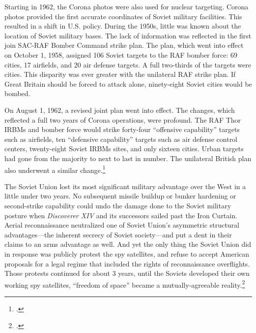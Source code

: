 \documentclass[14pt]{extarticle}
\begin{document}
\begin{quoteblock}
Starting in 1962, the Corona photos were also used for nuclear targeting. Corona photos provided the first accurate coordinates of Soviet military facilities. This resulted in a shift in U.S. policy. During the 1950s, little was known about the location of Soviet military bases. The lack of information was reflected in the first join SAC-RAF Bomber Command strike plan. The plan, which went into effect on October 1, 1958, assigned 106 Soviet targets to the RAF bomber force: 69 cities, 17 airfields, and 20 air defense targets. A full two-thirds of the targets were cities. This disparity was ever greater with the unilateral RAF strike plan. If Great Britain should be forced to attack alone, ninety-eight Soviet cities would be bombed.

On August 1, 1962, a revised joint plan went into effect. The changes, which reflected a full two years of Corona operations, were profound. The RAF Thor IRBMs and bomber force would strike forty-four ``offensive capability'' targets such as airfields, ten ``defensive capability'' targets such as air defense control centers, twenty-eight Soviet IRBMs sites, and only sixteen cities. Urban targets had gone from the majority to next to last in number. The unilateral British plan also underwent a similar change.\footcite[p.~139]{peebles_corona_1997}
\end{quoteblock}

The Soviet Union lost its most significant military advantage over the West in a little under two years. No subsequent missile buildup or bunker hardening or second-strike capability could undo the damage done to the Soviet military posture when \emph{Discoverer XIV} and its successors sailed past the Iron Curtain. Aerial reconnaissance neutralized one of Soviet Union's asymmetric structural advantages---the inherent secrecy of Soviet society---and put a dent in their claims to an arms advantage as well. And yet the only thing the Soviet Union did in response was publicly protest the spy satellites, and refuse to accept American proposals for a legal regime that included the rights of reconnaissance overflights. Those protests continued for about 3 years, until the Soviets developed their own working spy satellites, ``freedom of space'' became a mutually-agreeable reality.\footcite[p.~271-275]{mcdougall_heavens_1985}
\end{document}
